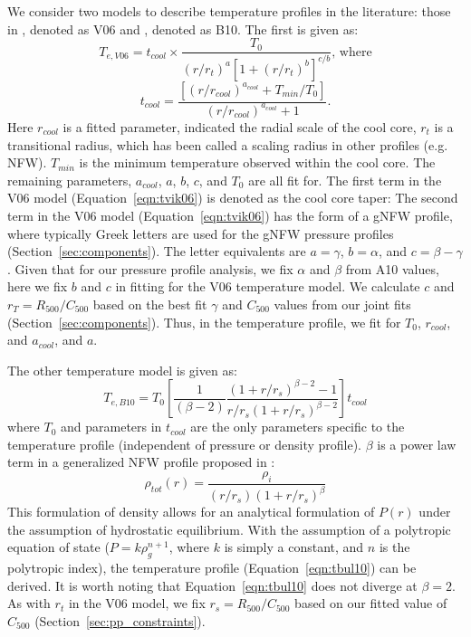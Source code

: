 \documentclass[iop,numberedappendix,apj]{emulateapj}
\begin{document}
We consider two models to describe temperature profiles in the literature: those in
\citet{vikhlinin2006}, denoted as V06 and \citet{bulbul2010}, denoted as B10. The first is given as:
\begin{equation}
  T_{e,V06} = t_{cool} \times \frac{T_0}{(r/r_t)^a [1 + (r/r_t)^b]^{c/b}} \text{, where}
  \label{eqn:tvik06}
\end{equation}
\begin{equation}
  t_{cool} = \frac{[(r / r_{cool})^{a_{cool}} + T_{min}/T_0]}{(r / r_{cool})^{a_{cool}} + 1}.
  \label{eqn:cc_taper}
\end{equation}
Here $r_{cool}$ is a fitted parameter, indicated the radial scale of the cool core, $r_t$ is a transitional radius,
which has been called a scaling radius in other profiles (e.g. NFW). $T_{min}$ is the minimum temperature observed
within the cool core. The remaining parameters, $a_{cool}$, $a$, $b$, $c$, and $T_0$ are all fit for. The first term
in the V06 model (Equation~\ref{eqn:tvik06}) is denoted as the cool core taper:
The second term in the V06 model (Equation~\ref{eqn:tvik06}) has the form of a gNFW profile, where typically Greek letters
are used for the gNFW pressure profiles (Section~\ref{sec:components}). The letter equivalents
are $a = \gamma$, $b = \alpha$, and $c = \beta - \gamma$. Given that for our pressure profile analysis, 
we fix $\alpha$ and $\beta$ from A10 values, here we fix $b$ and $c$ in fitting for the V06 temperature model.
We calculate $c$ and $r_T= R_{500}/C_{500}$ 
based on the best fit $\gamma$ and $C_{500}$ values from our joint fits (Section~\ref{sec:components}). 
Thus, in the temperature profile, we fit for $T_0$, $r_{cool}$, and $a_{cool}$, and $a$.

The other temperature model \citep{bulbul2010} is given as:
\begin{equation}
  T_{e,B10} = T_0 \left[ \frac{1}{(\beta - 2)} \frac{(1+ r/r_s)^{\beta-2} - 1}{r/r_s (1 + r/r_s)^{\beta-2}}\right] t_{cool}
  \label{eqn:tbul10}
\end{equation}
where $T_0$ and parameters in $t_{cool}$ are the only parameters specific to the temperature profile (independent of
pressure or density profile). $\beta$ is a power law term in a generalized NFW profile proposed in \citet{bulbul2010}:
\begin{equation}
  \rho_{tot}(r) = \frac{\rho_i}{(r/r_s)(1+r/r_s)^{\beta}}
  \label{eqn:bulgnfw}
\end{equation}
This formulation of density allows for an analytical formulation of $P(r)$ under the assumption of hydrostatic 
equilibrium. With the assumption of a polytropic equation of state ($P = k \rho_g^{n+1}$, where $k$ is simply a
constant, and $n$ is the polytropic index), the temperature profile (Equation~\ref{eqn:tbul10}) can be derived.
It is worth noting that Equation~\ref{eqn:tbul10} does not diverge at $\beta = 2$.
As with $r_t$ in the V06 model, we fix $r_s = R_{500}/C_{500}$ based on our fitted value of $C_{500}$ 
(Section~\ref{sec:pp_constraints}).
\end{document}
